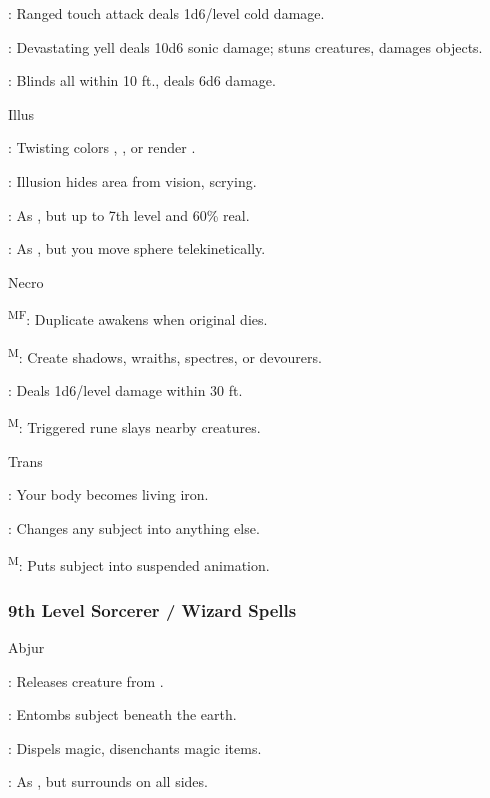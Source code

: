 : Ranged touch attack deals 1d6/level cold damage.

: Devastating yell deals 10d6 sonic damage; stuns creatures, damages objects.

: Blinds all within 10 ft., deals 6d6 damage.

Illus

: Twisting colors , , or render .

: Illusion hides area from vision, scrying.

: As , but up to 7th level and 60\% real.

: As , but you move sphere telekinetically.

Necro

\textsuperscript{M}\textsuperscript{F}: Duplicate awakens when original dies.

\textsuperscript{M}: Create shadows, wraiths, spectres, or devourers.

: Deals 1d6/level damage within 30 ft.

\textsuperscript{M}: Triggered rune slays nearby creatures.

Trans

: Your body becomes living iron.

: Changes any subject into anything else.

\textsuperscript{M}: Puts subject into suspended animation.

\subsubsection{9th Level Sorcerer / Wizard Spells}

Abjur

: Releases creature from .

: Entombs subject beneath the earth.

: Dispels magic, disenchants magic items.

: As , but surrounds on all sides.

